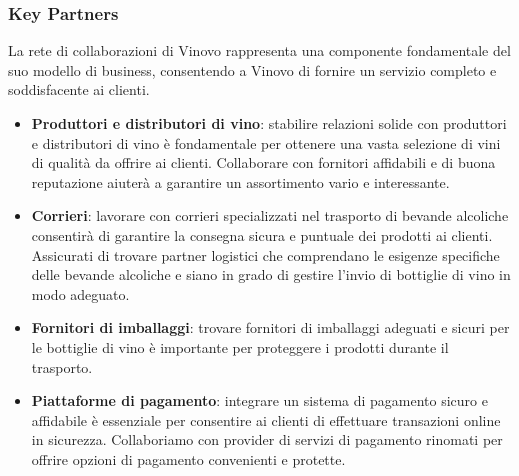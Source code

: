 \documentclass[12pt, a4paper]{article}
\begin{document}
\subsubsection{Key Partners}
La rete di collaborazioni di Vinovo rappresenta una componente fondamentale del suo modello di business, consentendo a Vinovo di fornire un servizio completo e soddisfacente ai clienti.
\begin{itemize}
    \item \textbf{Produttori e distributori di vino}: stabilire relazioni solide con produttori e distributori di vino è fondamentale per ottenere una vasta selezione di vini di qualità da offrire ai clienti. Collaborare con fornitori affidabili e di buona reputazione aiuterà a garantire un assortimento vario e interessante.
    \item \textbf{Corrieri}: lavorare con corrieri specializzati nel trasporto di bevande alcoliche consentirà di garantire la consegna sicura e puntuale dei prodotti ai clienti. Assicurati di trovare partner logistici che comprendano le esigenze specifiche delle bevande alcoliche e siano in grado di gestire l'invio di bottiglie di vino in modo adeguato.
    \item \textbf{Fornitori di imballaggi}: trovare fornitori di imballaggi adeguati e sicuri per le bottiglie di vino è importante per proteggere i prodotti durante il trasporto.
    \item \textbf{Piattaforme di pagamento}: integrare un sistema di pagamento sicuro e affidabile è essenziale per consentire ai clienti di effettuare transazioni online in sicurezza. Collaboriamo con provider di servizi di pagamento rinomati per offrire opzioni di pagamento convenienti e protette.
\end{itemize}
\end{document}
